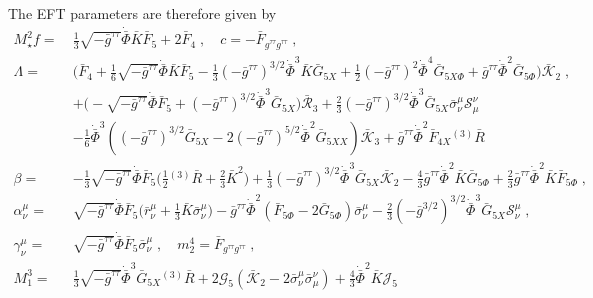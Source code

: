 \documentclass[a4paper,11pt]{article}
\numberwithin{equation}{section}
\begin{document}
The EFT parameters are therefore given by
\begin{align}
M_\star^2 f = \ & \frac{1}{3}\sqrt{-\bar{g}^{\tau\tau}} \dot{\bar{\Phi}} \bar{K} \bar{F}_5 + 2 \bar{F}_4 \;, \quad c = -\bar{F}_{g^{\tau\tau} g^{\tau\tau}}\;, \nonumber \\ 
\Lambda = \ &\bigg( \bar{F}_{4} + \frac{1}{6} \sqrt{-\bar{g}^{\tau\tau}}\dot{\bar{\Phi}} \bar{K} \bar{F}_5 - \frac{1}{3} (-\bar{g}^{\tau\tau})^{3/2}  \dot{\bar{\Phi}}^3 \bar{K} \bar{G}_{5 X} + \frac{1}{2} (-\bar{g}^{\tau\tau})^2 \dot{\bar{\Phi}}^4 \bar{G}_{5 X \Phi} + \bar{g}^{\tau\tau} \dot{\bar{\Phi}}^2 \bar{G}_{5\Phi}\bigg) \mathcal{\bar{K}}_2  \;, \nonumber \\
& + \bigg(-\sqrt{-\bar{g}^{\tau\tau}}\dot{\bar{\Phi}}\bar{F}_5 + (-\bar{g}^{\tau\tau})^{3/2} \dot{\bar{\Phi}}^3 \bar{G}_{5X} \bigg) \mathcal{\bar{R}}_3 +  \frac{2}{3} (-\bar{g}^{\tau\tau})^{3/2} \dot{\bar{\Phi}}^3 \bar{G}_{5X} \bar{\sigma}^\mu_\nu \mathcal{S}^\nu_\mu  \nonumber \\ 
&- \frac{1}{6} \dot{\bar{\Phi}}^3 ((-\bar{g}^{\tau\tau})^{3/2} \bar{G}_{5X} - 2 (-\bar{g}^{\tau\tau})^{5/2} \dot{\bar{\Phi}}^2 \bar{G}_{5XX} )\mathcal{\bar{K}}_3 + \bar{g}^{\tau\tau}\dot{\bar{\Phi}}^2 \bar{F}_{4X} {}^{(3)}\!\bar{R} \nonumber \\ 
 \beta = \ & - \frac{1}{3} \sqrt{-\bar{g}^{\tau\tau}} \dot{\bar{\Phi}}\bar{F}_5 \bigg(\frac{1}{2} {}^{(3)}\!\bar{R} + \frac{2}{3} \bar{K}^2 \bigg) + \frac{1}{3} (-\bar{g}^{\tau\tau})^{3/2} \dot{\bar{\Phi}}^3 \bar{G}_{5X} \mathcal{\bar{K}}_2 - \frac{4}{3} \bar{g}^{\tau\tau} \dot{\bar{\Phi}}^2 \bar{K} \bar{G}_{5\Phi}  + \frac{2}{3} \bar{g}^{\tau\tau} \dot{\bar{\Phi}}^2 \bar{K} \bar{F}_{5\Phi}\;, \nonumber \\
\alpha^\mu_\nu = \ & \sqrt{-\bar{g}^{\tau\tau}} \dot{\bar{\Phi}} \bar{F}_5 \bigg(\bar{r}^\mu_\nu + \frac{1}{3} \bar{K} \bar{\sigma}^\mu_\nu \bigg) - \bar{g}^{\tau\tau} \dot{\bar{\Phi}}^2 (\bar{F}_{5 \Phi} - 2 \bar{G}_{5\Phi})\bar{\sigma}^\mu_\nu - \frac{2}{3} (-\bar{g}^{3/2})^{3/2} \dot{\bar{\Phi}}^3 \bar{G}_{5X} \mathcal{S}^\mu_\nu \;, \nonumber \\
 \gamma^\mu_\nu = \ & \sqrt{-\bar{g}^{\tau\tau}} \dot{\bar{\Phi}} \bar{F}_5 \bar{\sigma}^\mu_\nu \;, \quad 
m_2^4 = \bar{F}_{g^{\tau\tau} g^{\tau\tau}} \;, \\ 
 M_1^3 = \ & \frac{1}{3}\sqrt{-\bar{g}^{\tau\tau}} \dot{\bar{\Phi}}^3 \bar{G}_{5X} {}^{(3)}\!\bar{R}  + 2 \mathcal{G}_5( \mathcal{\bar{K}}_2 - 2 \bar{\sigma}^\mu_\nu \bar{\sigma}^\nu_\mu )  + \frac{4}{3} \dot{\bar{\Phi}}^2 \bar{K} \mathcal{J}_5 \nonumber  \\ 

\end{align}
\end{document}

